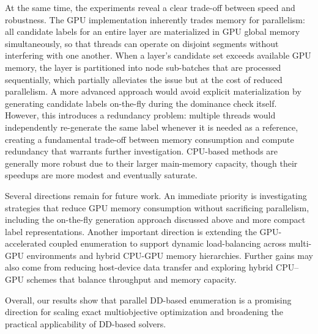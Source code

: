 \documentclass[letterpaper]{article}
\begin{document}
At the same time, the experiments reveal a clear trade-off between speed and robustness. The GPU implementation inherently trades memory for parallelism: all candidate labels for an entire layer are materialized in GPU global memory simultaneously, so that threads can operate on disjoint segments without interfering with one another. When a layer's candidate set exceeds available GPU memory, the layer is partitioned into node sub-batches that are processed sequentially, which partially alleviates the issue but at the cost of reduced parallelism. A more advanced approach would avoid explicit materialization by generating candidate labels on-the-fly during the dominance check itself. However, this introduces a redundancy problem: multiple threads would independently re-generate the same label whenever it is needed as a reference, creating a fundamental trade-off between memory consumption and compute redundancy that warrants further investigation. CPU-based methods are generally more robust due to their larger main-memory capacity, though their speedups are more modest and eventually saturate.

Several directions remain for future work. An immediate priority is investigating strategies that reduce GPU memory consumption without sacrificing parallelism, including the on-the-fly generation approach discussed above and more compact label representations. Another important direction is extending the GPU-accelerated coupled enumeration to support dynamic load-balancing across multi-GPU environments and hybrid CPU-GPU memory hierarchies. Further gains may also come from reducing host-device data transfer and exploring hybrid CPU--GPU schemes that balance throughput and memory capacity.

Overall, our results show that parallel DD-based enumeration is a promising direction for scaling exact multiobjective optimization and broadening the practical applicability of DD-based solvers.

% 
% 

\end{document}
